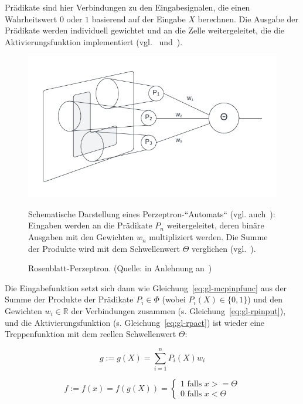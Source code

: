 Prädikate sind hier Verbindungen zu den Eingabesignalen, die einen Wahrheitswert $0$ oder $1$ basierend auf der Eingabe $X$ berechnen.
Die Ausgabe der Prädikate werden individuell gewichtet und an die Zelle weitergeleitet, die die Aktivierungsfunktion implementiert (vgl.~\cite[52 f.]{Roj93} und~\cite[8-12]{MP88}).


\begin{figure}[h]
    \begin{center}
    \includegraphics{chapters/3. Kuenstliche Neuronen/perzeptron}
    \caption{
        Rosenblatt-Perzeptron. (Quelle: in Anlehnung an~\cite[53, Abb. 3.2]{Roj93})
    }
    \label{fig-perctheda}
    \end{center}
    \small{
        Schematische Darstellung eines Perzeptron-``Automats`` (vgl. auch~\cite[7]{Ros57}): Eingaben werden an die Prädikate $P_n$ weitergeleitet, deren binäre Ausgaben mit den Gewichten $w_n$ multipliziert werden. Die Summe der Produkte wird mit dem Schwellenwert $\Theta$ verglichen (vgl.~\cite[53]{Roj93}).
    }
\end{figure}


Die Eingabefunktion setzt sich dann wie Gleichung~\ref{eq:gl-mcpinpfunc} aus der Summe der Produkte der Prädikate $P_i \in \Phi$ (wobei $P_i(X) \in \{0, 1\}$) und den Gewichten $w_i \in \mathbb{R}$ der Verbindungen zusammen (s. Gleichung~\ref{eq:gl-rpinput}), und die Aktivierungsfunktion (s. Gleichung~\ref{eq:gl-rpact}) ist wieder eine Treppenfunktion mit dem reellen Schwellenwert $\Theta$:

\begin{equation}
g:= g(X) = \sum^n_{i=1} P_i(X) w_i
\label{eq:gl-rpinput}
\end{equation}

\begin{equation}
    f:= f(x) = f(g(X)) = \begin{cases}
                          1 \text{ falls } x >= \Theta \\
                          0 \text{ falls } x < \Theta
\end{cases}
\label{eq:gl-rpact}
\end{equation}

